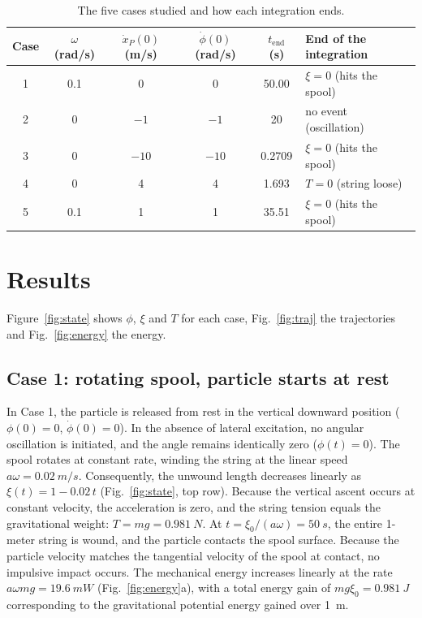 \documentclass[11pt,a4paper]{article}
\newcommand{\dt}[1]{\dot{#1}}
\begin{document}
\begin{table}[htbp]
\centering
\caption{The five cases studied and how each integration ends.}\label{tab:cases}
\begin{tabular}{cccccl}
\toprule
Case & $\omega$ (rad/s) & $\dt x_P(0)$ (m/s) & $\dt\phi(0)$ (rad/s) & $t_{\text{end}}$ (s) & End of the integration\\
\midrule
1 & 0.1 & 0 & 0 & 50.00 & $\xi=0$ (hits the spool)\\
2 & 0 & $-1$ & $-1$ & 20 & no event (oscillation)\\
3 & 0 & $-10$ & $-10$ & 0.2709 & $\xi=0$ (hits the spool)\\
4 & 0 & 4 & 4 & 1.693 & $T=0$ (string loose)\\
5 & 0.1 & 1 & 1 & 35.51 & $\xi=0$ (hits the spool)\\
\bottomrule
\end{tabular}
\end{table}

\clearpage

\section{Results}\label{sec:results}
Figure~\ref{fig:state} shows $\phi$, $\xi$ and $T$ for each case, Fig.~\ref{fig:traj} the trajectories and Fig.~\ref{fig:energy} the energy.

\subsection{Case 1: rotating spool, particle starts at rest}
In Case 1, the particle is released from rest in the vertical downward position ($\phi(0)=0$, $\dt\phi(0)=0$). In the absence of lateral excitation, no angular oscillation is initiated, and the angle remains identically zero ($\phi(t)=0$). The spool rotates at constant rate, winding the string at the linear speed $a\omega = \SI{0.02}{m/s}$. Consequently, the unwound length decreases linearly as $\xi(t) = 1 - 0.02\,t$ (Fig.~\ref{fig:state}, top row). Because the vertical ascent occurs at constant velocity, the acceleration is zero, and the string tension equals the gravitational weight: $T = mg = \SI{0.981}{N}$. At $t = \xi_0/(a\omega) = \SI{50}{s}$, the entire 1-meter string is wound, and the particle contacts the spool surface. Because the particle velocity matches the tangential velocity of the spool at contact, no impulsive impact occurs. The mechanical energy increases linearly at the rate $a\omega mg = \SI{19.6}{mW}$ (Fig.~\ref{fig:energy}a), with a total energy gain of $mg\xi_0 = \SI{0.981}{J}$ corresponding to the gravitational potential energy gained over \SI{1}{m}.
\end{document}
